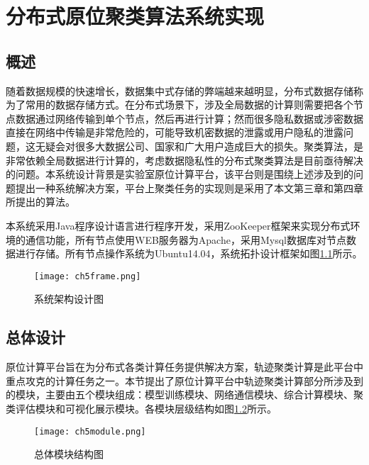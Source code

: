 \chapter{分布式原位聚类算法系统实现}

\section{概述}
随着数据规模的快速增长，数据集中式存储的弊端越来越明显，分布式数据存储称为了常用的数据存储方式。在分布式场景下，涉及全局数据的计算则需要把各个节点数据通过网络传输到单个节点，然后再进行计算；然而很多隐私数据或涉密数据直接在网络中传输是非常危险的，可能导致机密数据的泄露或用户隐私的泄露问题，这无疑会对很多大数据公司、国家和广大用户造成巨大的损失。聚类算法，是非常依赖全局数据进行计算的，考虑数据隐私性的分布式聚类算法是目前亟待解决的问题。本系统设计背景是实验室原位计算平台，该平台则是围绕上述涉及到的问题提出一种系统解决方案，平台上聚类任务的实现则是采用了本文第三章和第四章所提出的算法。

本系统采用Java程序设计语言进行程序开发，采用ZooKeeper框架来实现分布式环境的通信功能，所有节点使用WEB服务器为Apache，采用Mysql数据库对节点数据进行存储。所有节点操作系统为Ubuntu14.04，系统拓扑设计框架如图\ref{ch5frame}所示。
\begin{figure}[H]
	\texttt{[image: ch5frame.png]}
	\caption{系统架构设计图}
	\label{ch5frame}
\end{figure}

\section{总体设计}
原位计算平台旨在为分布式各类计算任务提供解决方案，轨迹聚类计算是此平台中重点攻克的计算任务之一。本节提出了原位计算平台中轨迹聚类计算部分所涉及到的模块，主要由五个模块组成：模型训练模块、网络通信模块、综合计算模块、聚类评估模块和可视化展示模块。各模块层级结构如图\ref{ch5module}所示。
\begin{figure}[H]
	\texttt{[image: ch5module.png]}
	\caption{总体模块结构图}
	\label{ch5module}
\end{figure}

